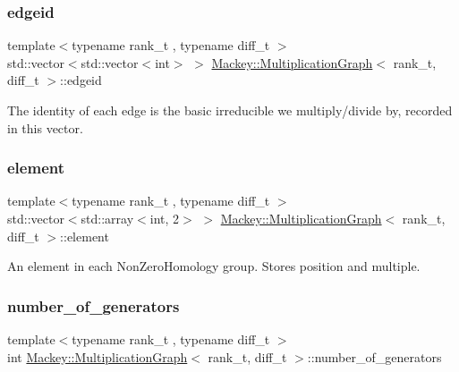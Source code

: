 \subsubsection{\texorpdfstring{edgeid}{edgeid}}
{\footnotesize\ttfamily template$<$typename rank\+\_\+t , typename diff\+\_\+t $>$ \\
std\+::vector$<$std\+::vector$<$int$>$ $>$ \hyperlink{classMackey_1_1MultiplicationGraph}{Mackey\+::\+Multiplication\+Graph}$<$ rank\+\_\+t, diff\+\_\+t $>$\+::edgeid\hspace{0.3cm}{\ttfamily [protected]}}



The identity of each edge is the basic irreducible we multiply/divide by, recorded in this vector. 

\mbox{\label{classMackey_1_1MultiplicationGraph_af2d7e83708b67fd4367b20755f2185e8}} 
\subsubsection{\texorpdfstring{element}{element}}
{\footnotesize\ttfamily template$<$typename rank\+\_\+t , typename diff\+\_\+t $>$ \\
std\+::vector$<$std\+::array$<$int, 2$>$ $>$ \hyperlink{classMackey_1_1MultiplicationGraph}{Mackey\+::\+Multiplication\+Graph}$<$ rank\+\_\+t, diff\+\_\+t $>$\+::element\hspace{0.3cm}{\ttfamily [protected]}}



An element in each Non\+Zero\+Homology group. Stores position and multiple. 

\mbox{\label{classMackey_1_1MultiplicationGraph_a9fd088a706e8c2ffeae3db1584de9266}} 
\subsubsection{\texorpdfstring{number\+\_\+of\+\_\+generators}{number\_of\_generators}}
{\footnotesize\ttfamily template$<$typename rank\+\_\+t , typename diff\+\_\+t $>$ \\
int \hyperlink{classMackey_1_1MultiplicationGraph}{Mackey\+::\+Multiplication\+Graph}$<$ rank\+\_\+t, diff\+\_\+t $>$\+::number\+\_\+of\+\_\+generators\hspace{0.3cm}{\ttfamily [protected]}}



